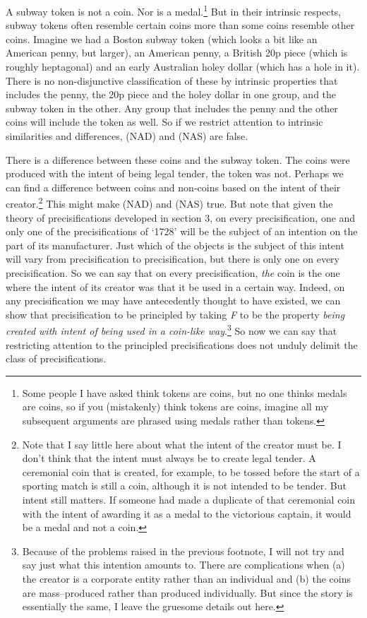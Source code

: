 \documentclass[
  10pt,
  letterpaper,
  DIV=11,
  numbers=noendperiod,
  twoside]{scrartcl}
\begin{document}
A subway token is not a coin. Nor is a medal.\footnote{Some people I
  have asked think tokens are coins, but no one thinks medals are coins,
  so if you (mistakenly) think tokens are coins, imagine all my
  subsequent arguments are phrased using medals rather than tokens.} But
in their intrinsic respects, subway tokens often resemble certain coins
more than some coins resemble other coins. Imagine we had a Boston
subway token (which looks a bit like an American penny, but larger), an
American penny, a British 20p piece (which is roughly heptagonal) and an
early Australian holey dollar (which has a hole in it). There is no
non-disjunctive classification of these by intrinsic properties that
includes the penny, the 20p piece and the holey dollar in one group, and
the subway token in the other. Any group that includes the penny and the
other coins will include the token as well. So if we restrict attention
to intrinsic similarities and differences, (NAD) and (NAS) are false.

There is a difference between these coins and the subway token. The
coins were produced with the intent of being legal tender, the token was
not. Perhaps we can find a difference between coins and non-coins based
on the intent of their creator.\footnote{Note that I say little here
  about what the intent of the creator must be. I don't think that the
  intent must always be to create legal tender. A ceremonial coin that
  is created, for example, to be tossed before the start of a sporting
  match is still a coin, although it is not intended to be tender. But
  intent still matters. If someone had made a duplicate of that
  ceremonial coin with the intent of awarding it as a medal to the
  victorious captain, it would be a medal and not a coin.} This might
make (NAD) and (NAS) true. But note that given the theory of
precisifications developed in section 3, on every precisification, one
and only one of the precisifications of `1728' will be the subject of an
intention on the part of its manufacturer. Just which of the objects is
the subject of this intent will vary from precisification to
precisification, but there is only one on every precisification. So we
can say that on every precisification, \emph{the} coin is the one where
the intent of its creator was that it be used in a certain way. Indeed,
on any precisification we may have antecedently thought to have existed,
we can show that precisification to be principled by taking \emph{F} to
be the property \emph{being created with intent of being used in a
coin-like way}.\footnote{Because of the problems raised in the previous
  footnote, I will not try and say just what this intention amounts to.
  There are complications when (a) the creator is a corporate entity
  rather than an individual and (b) the coins are mass--produced rather
  than produced individually. But since the story is essentially the
  same, I leave the gruesome details out here.} So now we can say that
restricting attention to the principled precisifications does not unduly
delimit the class of precisifications.
\end{document}

